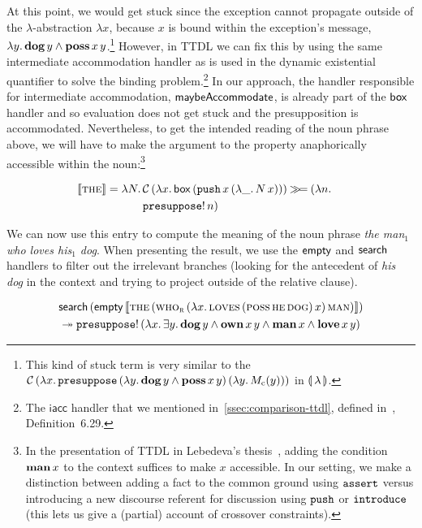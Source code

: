 At this point, we would get stuck since the exception cannot propagate
outside of the $\lambda$-abstraction $\lambda x$, because $x$ is bound
within the exception's message,
$\lambda y.\, \textbf{dog}\,y \land \textbf{poss}\,x\,y$.\footnote{This
  kind of stuck term is very similar to the
  $\mathcal{C}\,(\lambda x.\, \mathtt{presuppose}\,(\lambda y.\, \textbf{dog}\,y \land
          \textbf{poss}\,x\,y)\,(\lambda y.\, M_{\mathrm{c}}(y)))$ in
  ${\llparenthesis \, \lambda \, \rrparenthesis}$.} However, in TTDL we can fix this by using the same intermediate
accommodation handler as is used in the dynamic existential quantifier to
solve the binding problem.\footnote{The $\textsf{iacc}$ handler that we
  mentioned in~\ref{ssec:comparison-ttdl}, defined
  in~\cite{lebedeva2012expression}, Definition~6.29.} In our approach, the
handler responsible for intermediate accommodation, $\mathsf{maybeAccommodate}$, is
already part of the $\mathsf{box}$ handler and so evaluation does not get stuck and
the presupposition is accommodated. Nevertheless, to get the intended
reading of the noun phrase above, we will have to make the argument to the
property anaphorically accessible within the noun:\footnote{In the
  presentation of TTDL in Lebedeva's thesis~\cite{lebedeva2012expression},
  adding the condition $\textbf{man}\,x$ to the context suffices to make
  $x$ accessible. In our setting, we make a distinction between adding a
  fact to the common ground using $\mathtt{assert}$ versus introducing a new
  discourse referent for discussion using $\mathtt{push}$ or $\mathtt{introduce}$
  (this lets us give a (partial) account of crossover constraints).}

\begin{align*}
  \llbracket \textsc{the} \rrbracket &= \lambda N.\, \begin{aligned}[t]
      &\mathcal{C}\,(\lambda x.\, \mathsf{box}\,(\mathtt{push}\,x\,(\lambda \_.\, N\,x))) \mathbin{\gg\!=} (\lambda n.\,  \\
      &\mathtt{presuppose}!\,n)
    \end{aligned}
\end{align*}

We can now use this entry to compute the meaning of the noun phrase
\emph{the man$_1$ who loves his$_1$ dog}. When presenting the result, we
use the $\mathsf{empty}$ and $\mathsf{search}$ handlers to filter out the irrelevant
branches (looking for the antecedent of \emph{his dog} in the context and
trying to project outside of the relative clause).

\begin{align*}
& \mathsf{search}\,(\mathsf{empty}\,\llbracket \textsc{the}\,(\textsc{who}_{\textsc{r}}\,(\lambda x.\, \textsc{loves}\,(\textsc{poss}\,\textsc{he}\,\textsc{dog})\,x)\,\textsc{man}) \rrbracket) \\
& \twoheadrightarrow \mathtt{presuppose}!\,(\lambda x.\, \exists y.\, \textbf{dog}\,y \land
  \textbf{own}\,x\,y \land \textbf{man}\,x \land \textbf{love}\,x\,y)
\end{align*}

